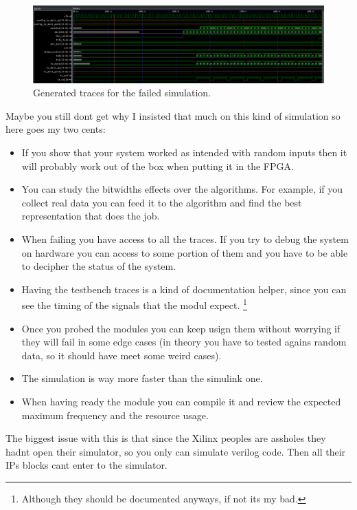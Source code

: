 \begin{figure}
    \centering
    \includegraphics[width=1\textwidth]{images/gtk_traces.png}
    \caption{Generated traces for the failed simulation.}
    \label{fig:cocotb_trace}
\end{figure}


Maybe you still dont get why I insisted that much on this kind of simulation so here goes my two cents:
\begin{itemize}
    \item If you show that your system worked as intended with random inputs then it will probably work out of the box when putting it in the FPGA.
    \item You can study the bitwidths effects over the algorithms. For example, if you collect real data you can feed it to the algorithm and find the best representation that does the job.
    \item When failing you have access to all the traces. If you try to debug the system on hardware you can access to some portion of them and you have to be able to decipher the status of the system.
    \item Having the testbench traces is a kind of documentation helper, since you can see the timing of the signals that the modul expect. \footnote{Although they should be documented anyways, if not its my bad.}
    \item Once you probed the modules you can keep usign them without worrying if they will fail in some edge cases (in theory you have to tested agains random data, so it should have meet some weird cases).
    \item The simulation is way more faster than the simulink one.
    \item When having ready the module you can compile it and review the expected maximum frequency and the resource usage.
\end{itemize}

The biggest issue with this is that since the Xilinx peoples are assholes they hadnt open their simulator, so you only can simulate verilog code. Then all their IPs blocks cant enter to the simulator.




